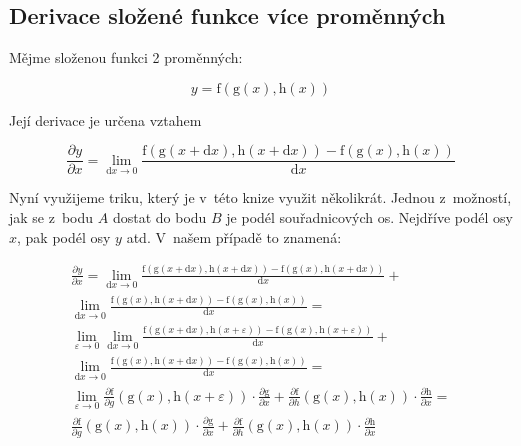 \subsection{Derivace složené funkce více proměnných}

Mějme složenou funkci 2 proměnných:

\begin{equation}
y = \mathrm{f}(\mathrm{g}(x), \mathrm{h}(x))
\end{equation}

Její derivace je určena vztahem

\begin{equation}
\frac{\partial y}{\partial x} = \lim_{\mathrm{d}x \to 0} \frac{\mathrm{f}(\mathrm{g}(x + \mathrm{d}x), \mathrm{h}(x + \mathrm{d}x)) - \mathrm{f}(\mathrm{g}(x), \mathrm{h}(x))}{\mathrm{d}x}
\end{equation}

Nyní využijeme triku, který je v~této knize využit několikrát. Jednou z~možností, jak se z~bodu \(A\) dostat do bodu \(B\) je podél souřadnicových os. Nejdříve podél osy \(x\), pak podél osy \(y\) atd. V~našem případě to znamená:


\begin{equation}
\begin{split}
\frac{\partial y}{\partial x} = \lim_{\mathrm{d}x \to 0} \frac{\mathrm{f}(\mathrm{g}(x + \mathrm{d}x), \mathrm{h}(x + \mathrm{d}x)) - \mathrm{f}(\mathrm{g}(x), \mathrm{h}(x + \mathrm{d}x))}{\mathrm{d}x} + \\
\lim_{\mathrm{d}x \to 0} \frac{\mathrm{f}(\mathrm{g}(x), \mathrm{h}(x + \mathrm{d}x)) - \mathrm{f}(\mathrm{g}(x), \mathrm{h}(x))}{\mathrm{d}x} = \\
\lim_{\varepsilon \to 0} \lim_{\mathrm{d}x \to 0} \frac{\mathrm{f}(\mathrm{g}(x + \mathrm{d}x), \mathrm{h}(x + \varepsilon)) - \mathrm{f}(\mathrm{g}(x), \mathrm{h}(x + \varepsilon))}{\mathrm{d}x} + \\
\lim_{\mathrm{d}x \to 0} \frac{\mathrm{f}(\mathrm{g}(x), \mathrm{h}(x + \mathrm{d}x)) - \mathrm{f}(\mathrm{g}(x), \mathrm{h}(x))}{\mathrm{d}x} = \\
\lim_{\varepsilon \to 0} \frac{\partial \mathrm{f}}{\partial g}(\mathrm{g}(x), \mathrm{h}(x + \varepsilon)) \cdot \frac{\partial \mathrm{g}}{\partial x} +
\frac{\partial \mathrm{f}}{\partial h}(\mathrm{g}(x), \mathrm{h}(x)) \cdot \frac{\partial \mathrm{h}}{\partial x} = \\
\frac{\partial \mathrm{f}}{\partial g}(\mathrm{g}(x), \mathrm{h}(x)) \cdot \frac{\partial \mathrm{g}}{\partial x} +
\frac{\partial \mathrm{f}}{\partial h}(\mathrm{g}(x), \mathrm{h}(x)) \cdot \frac{\partial \mathrm{h}}{\partial x}
\end{split}
\end{equation}

